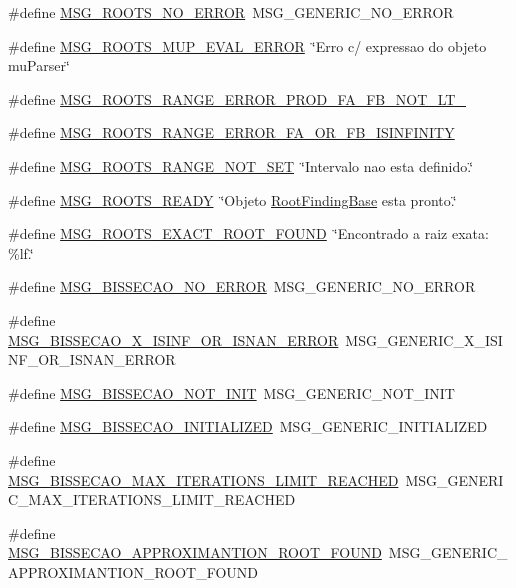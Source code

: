 \begin{CompactItemize}
\item 
\#define \hyperlink{group____messages_g8ccd3ef3d66c52d9a2f5c56b7c62e837}{MSG\_\-ROOTS\_\-NO\_\-ERROR}~MSG\_\-GENERIC\_\-NO\_\-ERROR
\item 
\#define \hyperlink{group____messages_g4c5e1f67fc078b0bb717e112d9ecad23}{MSG\_\-ROOTS\_\-MUP\_\-EVAL\_\-ERROR}~\char`\"{}Erro c/ expressao do objeto muParser\char`\"{}
\item 
\#define \hyperlink{group____messages_g1257e2172f0d24792e5bae382b6c8ffd}{MSG\_\-ROOTS\_\-RANGE\_\-ERROR\_\-PROD\_\-FA\_\-FB\_\-NOT\_\-LT\_}
\item 
\#define \hyperlink{group____messages_ge0c1e0d68faa6da65e9ff27c587fe1e7}{MSG\_\-ROOTS\_\-RANGE\_\-ERROR\_\-FA\_\-OR\_\-FB\_\-ISINFINITY}
\item 
\#define \hyperlink{group____messages_g351b0a132b97b932e9152973ca84ab0f}{MSG\_\-ROOTS\_\-RANGE\_\-NOT\_\-SET}~\char`\"{}Intervalo nao esta definido.\char`\"{}
\item 
\#define \hyperlink{group____messages_gf99c4ab1f930201e0632f3d2e3267438}{MSG\_\-ROOTS\_\-READY}~\char`\"{}Objeto \hyperlink{structRootFindingBase}{RootFindingBase} esta pronto.\char`\"{}
\item 
\#define \hyperlink{group____messages_gb6dcd48efc265c326e568344c2040775}{MSG\_\-ROOTS\_\-EXACT\_\-ROOT\_\-FOUND}~\char`\"{}Encontrado a raiz exata: \%lf.\char`\"{}
\item 
\#define \hyperlink{group____messages_g1327a0d7098c8506ebbba8fa51a2861c}{MSG\_\-BISSECAO\_\-NO\_\-ERROR}~MSG\_\-GENERIC\_\-NO\_\-ERROR
\item 
\#define \hyperlink{group____messages_g40526857730e9af294e61ff82c37c989}{MSG\_\-BISSECAO\_\-X\_\-ISINF\_\-OR\_\-ISNAN\_\-ERROR}~MSG\_\-GENERIC\_\-X\_\-ISINF\_\-OR\_\-ISNAN\_\-ERROR
\item 
\#define \hyperlink{group____messages_g532d2bf3026df42582d5fa103bbc3188}{MSG\_\-BISSECAO\_\-NOT\_\-INIT}~MSG\_\-GENERIC\_\-NOT\_\-INIT
\item 
\#define \hyperlink{group____messages_gd7a7400cbd6447204201e1338a9faf5e}{MSG\_\-BISSECAO\_\-INITIALIZED}~MSG\_\-GENERIC\_\-INITIALIZED
\item 
\#define \hyperlink{group____messages_gad91cc85f95e709099e9e0b7c4c78648}{MSG\_\-BISSECAO\_\-MAX\_\-ITERATIONS\_\-LIMIT\_\-REACHED}~MSG\_\-GENERIC\_\-MAX\_\-ITERATIONS\_\-LIMIT\_\-REACHED
\item 
\#define \hyperlink{group____messages_g419a2b04764be63f8c5bd9a2d561fbdf}{MSG\_\-BISSECAO\_\-APPROXIMANTION\_\-ROOT\_\-FOUND}~MSG\_\-GENERIC\_\-APPROXIMANTION\_\-ROOT\_\-FOUND

\end{CompactItemize}

